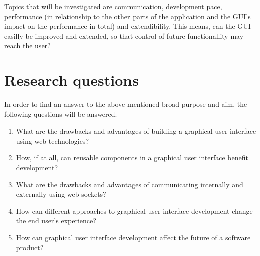 Topics that will be investigated are communication, development pace, performance (in relationship to the other parts of the application and the GUI's impact on the performance in total) and extendibility. This means, can the GUI easilly be improved and extended, so that control of future functionallity may reach the user?



\section{Research questions}
\label{sec:research-questions}



In order to find an answer to the above mentioned broad purpose and aim, the following questions will be answered.

\begin{enumerate}
  \item What are the drawbacks and advantages of building a graphical user interface using web technologies? \label{q:drawbacks}
  \item How, if at all, can reusable components in a graphical user interface benefit development? \label{q:reuse}
  \item What are the drawbacks and advantages of communicating internally and externally using web sockets? \label{q:websocket}
  \item How can different approaches to graphical user interface development change the end user's experience? \label{q:approach}
  \item How can graphical user interface development affect the future of a software product? \label{q:future}
\end{enumerate}


